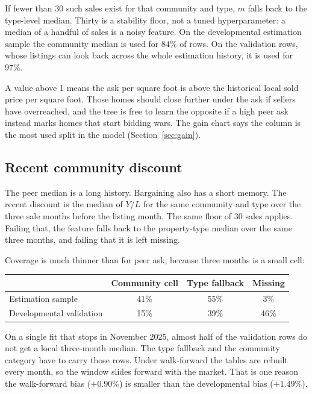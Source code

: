 \documentclass[11pt]{article}
\begin{document}
If fewer than 30 such sales exist for that community and type, \(m\) falls back to the type-level median. Thirty is a stability floor, not a tuned hyperparameter: a median of a handful of sales is a noisy feature. On the developmental estimation sample the community median is used for \(84\%\) of rows. On the validation rows, whose listings can look back across the whole estimation history, it is used for \(97\%\).

A value above 1 means the ask per square foot is above the historical local sold price per square foot. Those homes should close further under the ask if sellers have overreached, and the tree is free to learn the opposite if a high peer ask instead marks homes that start bidding wars. The gain chart says the column is the most used split in the model (Section~\ref{sec:gain}).

\subsection{Recent community discount}

The peer median is a long history. Bargaining also has a short memory. The recent discount is the median of \(Y/L\) for the same community and type over the three sale months before the listing month. The same floor of 30 sales applies. Failing that, the feature falls back to the property-type median over the same three months, and failing that it is left missing.

Coverage is much thinner than for peer ask, because three months is a small cell:

\begin{center}
\begin{tabular}{lccc}
\toprule
 & Community cell & Type fallback & Missing \\
\midrule
Estimation sample & 41\% & 55\% & 3\% \\
Developmental validation & 15\% & 39\% & 46\% \\
\bottomrule
\end{tabular}
\end{center}

On a single fit that stops in November 2025, almost half of the validation rows do not get a local three-month median. The type fallback and the community category have to carry those rows. Under walk-forward the tables are rebuilt every month, so the window slides forward with the market. That is one reason the walk-forward bias (\(+0.90\%\)) is smaller than the developmental bias (\(+1.49\%\)).
\end{document}
